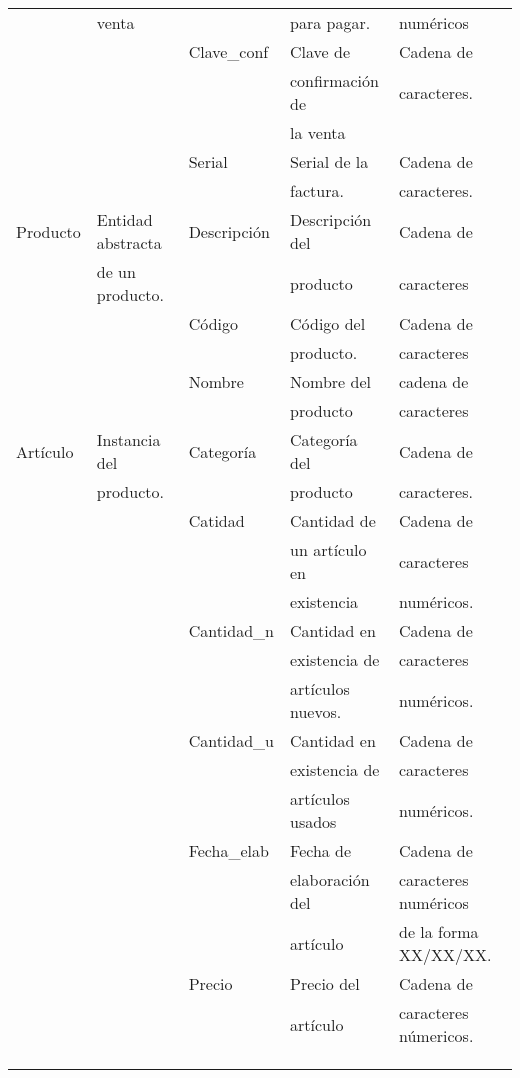 \documentclass{article}
\begin{document}
\begin{table}[h]
{\begin{tabular}{|l|l|l|l|l|}
 & venta & & para pagar. & num\'ericos\\ \cline{3-5}
 & & Clave\_conf & Clave de & Cadena de \\
 & & & confirmaci\'on de & caracteres.\\
 & & & la venta &\\ \cline{3-5}
 & & Serial & Serial de la & Cadena de \\
 & & & factura. & caracteres.\\ \cline{3-5}
Producto & Entidad abstracta & Descripci\'on & Descripci\'on del & Cadena de\\
 & de un producto.& & producto & caracteres\\ \cline{3-5}
 & & C\'odigo & C\'odigo del & Cadena de \\
 & & & producto. & caracteres \\ \cline{3-5}
 & & Nombre & Nombre del & cadena de \\
 & & & producto & caracteres \\ \hline
Art\'iculo & Instancia del & Categor\'ia & Categor\'ia del & Cadena de\\
 & producto. & & producto & caracteres.\\ \cline{3-5}
 & & Catidad & Cantidad de & Cadena de \\
 & & & un art\'iculo en & caracteres \\
 & & & existencia & num\'ericos. \\ \cline{3-5}
 & & Cantidad\_n & Cantidad en & Cadena de\\
 & & & existencia de & caracteres \\
 & & & art\'iculos nuevos.& num\'ericos.\\ \cline{3-5}
 & & Cantidad_u & Cantidad en & Cadena de\\
 & & & existencia de & caracteres \\
 & & & art\'iculos usados & num\'ericos. \\ \cline{3-5}
 & & Fecha_elab & Fecha de & Cadena de\\
 & & & elaboraci\'on del & caracteres num\'ericos \\
 & & & art\'iculo & de la forma XX/XX/XX.\\ \cline{3-5}
 & & Precio & Precio del & Cadena de \\
 & & & art\'iculo & caracteres n\'umericos. \\ \cline{3-5}
 & & & &\\
 & & & &\\
 & & & &\\

\end{tabular}}
\end{table}
\end{document}
